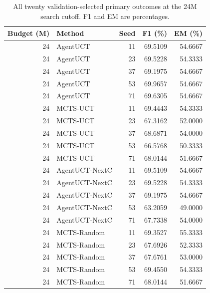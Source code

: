 \begin{table}[t]
\centering\small
\setlength{\tabcolsep}{4pt}
\caption{All twenty validation-selected primary outcomes at the 24M search cutoff. F1 and EM are percentages.}
\label{tab:seed-values-b24000000}
\begin{tabular}{rlrrr}
\toprule
Budget (M) & Method & Seed & F1 (\%) & EM (\%) \\
\midrule
24 & AgentUCT & 11 & 69.5109 & 54.6667 \\
24 & AgentUCT & 23 & 69.5228 & 54.3333 \\
24 & AgentUCT & 37 & 69.1975 & 54.6667 \\
24 & AgentUCT & 53 & 69.9657 & 54.6667 \\
24 & AgentUCT & 71 & 69.6305 & 54.6667 \\
24 & MCTS-UCT & 11 & 69.4443 & 54.3333 \\
24 & MCTS-UCT & 23 & 67.3162 & 52.0000 \\
24 & MCTS-UCT & 37 & 68.6871 & 54.0000 \\
24 & MCTS-UCT & 53 & 66.5768 & 50.3333 \\
24 & MCTS-UCT & 71 & 68.0144 & 51.6667 \\
24 & AgentUCT-NextC & 11 & 69.5109 & 54.6667 \\
24 & AgentUCT-NextC & 23 & 69.5228 & 54.3333 \\
24 & AgentUCT-NextC & 37 & 69.1975 & 54.6667 \\
24 & AgentUCT-NextC & 53 & 63.2059 & 49.0000 \\
24 & AgentUCT-NextC & 71 & 67.7338 & 54.0000 \\
24 & MCTS-Random & 11 & 69.3527 & 55.3333 \\
24 & MCTS-Random & 23 & 67.6926 & 52.3333 \\
24 & MCTS-Random & 37 & 67.6761 & 53.0000 \\
24 & MCTS-Random & 53 & 69.4550 & 54.3333 \\
24 & MCTS-Random & 71 & 68.0144 & 51.6667 \\
\bottomrule
\end{tabular}
\end{table}

